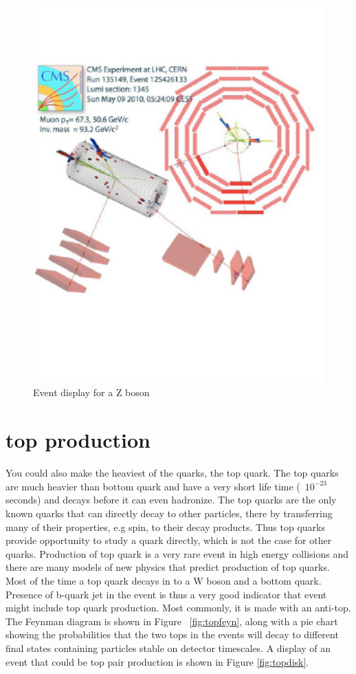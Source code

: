 \begin{figure}[h]
\centering\includegraphics[scale=0.5]{./protonprotoncollisions/Pictures/wzevent.pdf}
\caption{Event display for a Z boson}
\label{fig:wzevent}
\end{figure}

\section{top production}

You could also make the heaviest of the quarks, the top quark.  The top quarks are much heavier than bottom quark and have a very short life time (~$10^{-23}$ seconds) and decays before it can even hadronize. The top quarks are the only known quarks that can directly decay to other particles, there by transferring many of their properties, e.g spin, to their decay products. Thus top quarks provide opportunity to study a quark directly, which is not the case for other quarks. Production of top quark is a very rare event in high energy collisions and there are many models of new physics that predict production of top quarks.   Most of the time a top quark decays in to a W boson and a bottom quark.  Presence of b-quark jet  in the event is thus a very good indicator that event might include top quark production. Most commonly, it is made with an anti-top.   The Feynman diagram is shown in Figure ~\ref{fig:topfeyn}, along with a pie chart showing the probabilities that the two tops in the events will decay to different final states containing particles stable on detector timescales.  A display of an event that could be top pair production is shown in Figure \ref{fig:topdisk}.

